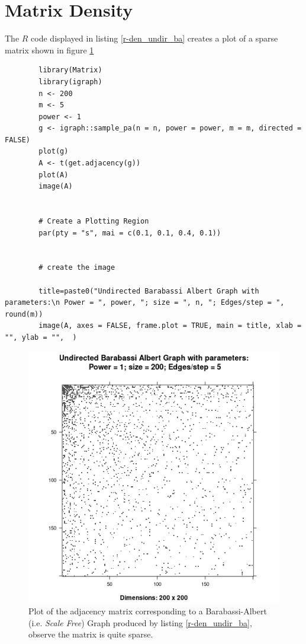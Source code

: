 \documentclass[11pt]{report}
\begin{document}
\section{Matrix Density}
The \(\mathbf{\mathit{R}}\) code displayed in listing \ref{r-den_undir_ba} creates a plot of a sparse matrix shown in figure \ref{fig:den_undir_ba}
\begin{listing}[htbp]
    \begin{tcolorbox}
        \begin{verbatim}
        library(Matrix)
        library(igraph)
        n <- 200
        m <- 5
        power <- 1
        g <- igraph::sample_pa(n = n, power = power, m = m, directed = FALSE)
        plot(g)
        A <- t(get.adjacency(g))
        plot(A)
        image(A)


        # Create a Plotting Region
        par(pty = "s", mai = c(0.1, 0.1, 0.4, 0.1))


        # create the image

        title=paste0("Undirected Barabassi Albert Graph with parameters:\n Power = ", power, "; size = ", n, "; Edges/step = ", round(m))
        image(A, axes = FALSE, frame.plot = TRUE, main = title, xlab = "", ylab = "",  )
        \end{verbatim}
    \end{tcolorbox}
\caption{\label{r-den_undir_ba}\textbf{\emph{R}} code to produce an image illustrating the density of a simulated Barabassi-Albert graph, the \emph{Barabassi-Albert} graph is a good analogue for the link structure of the internet \cite{langvilleGooglePageRankScience2012,barabasiPhysicsWeb2001,barabasiScalefreeCharacteristicsRandom2000} see the output in figure \ref{fig:den_undir_ba}}
\end{listing}

\begin{figure}[htbp]
\centering
\includegraphics[width=12cm]{media/DensityUndirectedBA.png}
\caption{\label{fig:den_undir_ba}Plot of the adjacency matrix corresponding to a Barabassi-Albert (i.e. \emph{Scale Free}) Graph produced by listing \ref{r-den_undir_ba}, observe the matrix is quite sparse.}
\end{figure}
\end{document}
